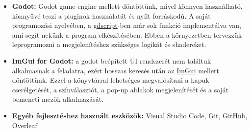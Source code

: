 \documentclass[fontsize=12pt,a4paper]{article}
\begin{document}
\begin{itemize}
    \item \textbf{Godot:}  Godot game engine mellett döntöttünk, mivel könnyen használható, könnyűvé teszi a pluginok használatát és nyílt forráskodú. A saját programozási nyelvében, a \href{https://docs.godotengine.org/en/stable/tutorials/scripting/gdscript/gdscript_basics.html}{gdscript}-ben már sok funkció implementálva van, ami segít nekünk a program elkészítésében. Ebben a környezetben tervezzük leprogramozni a megjelenítéshez szükséges logikát és shadereket.
    \item \textbf{ImGui for Godot:} a godot beépített UI rendszerét nem találtuk alkalmasnak a feladatra, ezért hosszas keresés után az \href{https://godotengine.org/asset-library/asset/2985}{ImGui} mellett döntöttünk. Ezzel a könyvtárral lehetséges megvalósítani a kapuk cserélgetését, a színválasztót, a pop-up ablakok megjelenítését és a saját bemeneti mezők alkalmazását.
    \item \textbf{Egyéb fejlesztéshez használt eszközök:} Visual Studio Code, Git, GitHub, Overleaf
\end{itemize}
\end{document}
